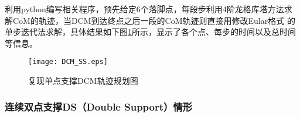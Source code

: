             利用python编写相关程序，预先给定6个落脚点，每段步利用4阶龙格库塔方法求解CoM的轨迹，当DCM到达终点之后一段的CoM轨迹则直接用修改Eular格式
            的单步迭代法求解，具体结果如下图\ref{fig2-4}所示，显示了各个点、每步的时间以及总时间等信息。
            \begin{figure}[h] 
                \centering
                \texttt{[image: DCM\_SS.eps]}
                \caption{复现单点支撑DCM轨迹规划图} \label{fig2-4}
            \end{figure}
        \subsubsection{连续双点支撑DS（Double Support）情形}
            


